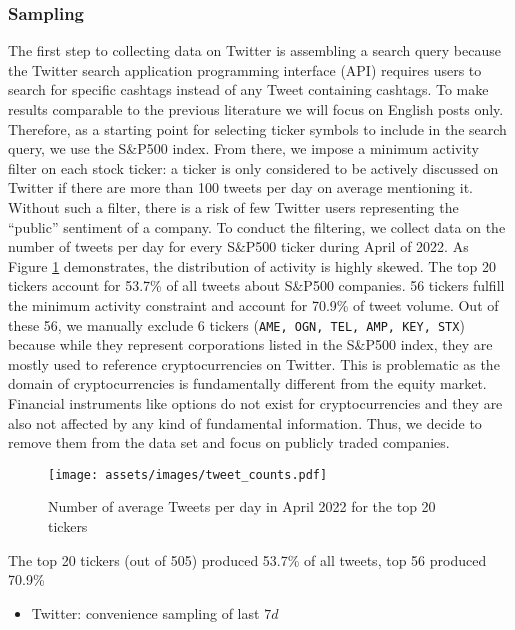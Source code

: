 \subsubsection{Sampling}

The first step to collecting data on Twitter is assembling a search query because the Twitter search application programming interface (API) requires users to search for specific cashtags instead of any Tweet containing cashtags. To make results comparable to the previous literature we will focus on English posts only. Therefore, as a starting point for selecting ticker symbols to include in the search query, we use the S\&P500 index. From there, we impose a minimum activity filter on each stock ticker: a ticker is only considered to be actively discussed on Twitter if there are more than 100 tweets per day on average mentioning it. Without such a filter, there is a risk of few Twitter users representing the ``public'' sentiment of a company. To conduct the filtering, we collect data on the number of tweets per day for every S\&P500 ticker during April of 2022. As Figure \ref{figure-tweet-activity} demonstrates, the distribution of activity is highly skewed. The top 20 tickers account for 53.7\% of all tweets about S\&P500 companies. 56 tickers fulfill the minimum activity constraint and account for 70.9\% of tweet volume. Out of these 56, we manually exclude 6 tickers (\texttt{AME, OGN, TEL, AMP, KEY, STX}) because while they represent corporations listed in the S\&P500 index, they are mostly used to reference cryptocurrencies on Twitter. This is problematic as the domain of cryptocurrencies is fundamentally different from the equity market. Financial instruments like options do not exist for cryptocurrencies and they are also not affected by any kind of fundamental information. Thus, we decide to remove them from the data set and focus on publicly traded companies.

\begin{figure}
	\texttt{[image: assets/images/tweet\_counts.pdf]}
	\caption{Number of average Tweets per day in April 2022 for the top 20 tickers}
	\label{figure-tweet-activity}
\end{figure}

The top 20 tickers (out of 505) produced 53.7\% of all tweets, top 56 produced 70.9\%
\begin{itemize}[noitemsep]
	\item Twitter: convenience sampling of last $7d$
\end{itemize}


